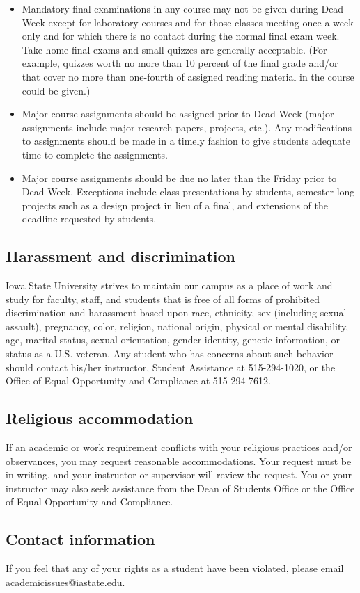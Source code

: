 \begin{itemize}
\item Mandatory final examinations in any course may not be given
  during Dead Week except for laboratory courses and for those classes
  meeting once a week only and for which there is no contact during
  the normal final exam week. Take home final exams and small quizzes
  are generally acceptable. (For example, quizzes worth no more than
  10 percent of the final grade and/or that cover no more than
  one-fourth of assigned reading material in the course could be
  given.)
\item Major course assignments should be assigned prior to Dead Week
  (major assignments include major research papers, projects,
  etc.). Any modifications to assignments should be made in a timely
  fashion to give students adequate time to complete the assignments.
\item Major course assignments should be due no later than the Friday
  prior to Dead Week. Exceptions include class presentations by
  students, semester-long projects such as a design project in lieu of
  a final, and extensions of the deadline requested by students.
\end{itemize}

\subsection{Harassment and discrimination}

Iowa State University strives to maintain our campus as a place of
work and study for faculty, staff, and students that is free of all
forms of prohibited discrimination and harassment based upon race,
ethnicity, sex (including sexual assault), pregnancy, color, religion,
national origin, physical or mental disability, age, marital status,
sexual orientation, gender identity, genetic information, or status as
a U.S. veteran. Any student who has concerns about such behavior
should contact his/her instructor, Student Assistance at 515-294-1020,
or the Office of Equal Opportunity and Compliance at 515-294-7612.

\subsection{Religious accommodation}

If an academic or work requirement conflicts with your religious
practices and/or observances, you may request reasonable
accommodations. Your request must be in writing, and your instructor
or supervisor will review the request.  You or your instructor may
also seek assistance from the Dean of Students Office or the Office of
Equal Opportunity and Compliance.

\subsection{Contact information}

If you feel that any of your rights as a student have been violated,
please email \url{academicissues@iastate.edu}.


